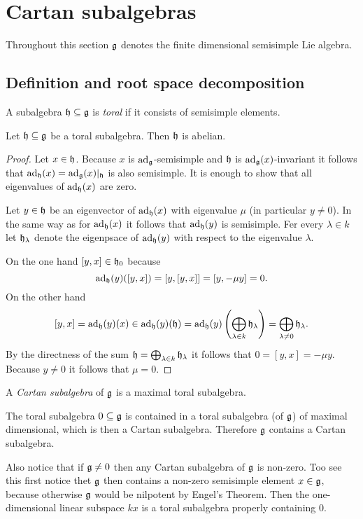 \section{Cartan subalgebras}
Throughout this section $\mathfrak{g}$ denotes the finite dimensional semisimple Lie algebra.





\subsection{Definition and root space decomposition}


\begin{defi}
 A subalgebra $\mathfrak{h} \subseteq \mathfrak{g}$ is \emph{toral} if it consists of semisimple elements.
\end{defi}


\begin{lem}
 Let $\mathfrak{h} \subseteq \mathfrak{g}$ be a toral subalgebra. Then $\mathfrak{h}$ is abelian.
\end{lem}
\begin{proof}
 Let $x \in \mathfrak{h}$. Because $x$ is $\operatorname{ad}_{\mathfrak{g}}$-semisimple and $\mathfrak{h}$ is $\operatorname{ad}_{\mathfrak{g}}(x)$-invariant it follows that $\operatorname{ad}_{\mathfrak{h}}(x) = \operatorname{ad}_{\mathfrak{g}}(x)|_{\mathfrak{h}}$ is also semisimple. It is enough to show that all eigenvalues of $\operatorname{ad}_{\mathfrak{h}}(x)$ are zero.
 
 Let $y \in \mathfrak{h}$ be an eigenvector of $\operatorname{ad}_{\mathfrak{h}}(x)$ with eigenvalue $\mu$ (in particular $y \neq 0$). In the same way as for $\operatorname{ad}_{\mathfrak{h}}(x)$ it follows that $\operatorname{ad}_{\mathfrak{h}}(y)$ is semisimple. Fer every $\lambda \in k$ let $\mathfrak{h}_\lambda$ denote the eigenpsace of $\operatorname{ad}_{\mathfrak{h}}(y)$ with respect to the eigenvalue $\lambda$.
 
  On the one hand $[y,x] \in \mathfrak{h}_0$ because
 \[
  \operatorname{ad}_{\mathfrak{h}}(y)([y,x])
  = [y,[y,x]]
  = [y, -\mu y]
  = 0.
 \]
 On the other hand
 \[
  [y,x]
  = \operatorname{ad}_{\mathfrak{h}}(y)(x)
  \in \operatorname{ad}_{\mathfrak{h}}(y)(\mathfrak{h})
  = \operatorname{ad}_{\mathfrak{h}}(y)\left( \bigoplus_{\lambda \in k} \mathfrak{h}_\lambda \right)
  = \bigoplus_{\lambda \neq 0} \mathfrak{h}_\lambda.
 \]
 By the directness of the sum $\mathfrak{h} = \bigoplus_{\lambda \in k} \mathfrak{h}_\lambda$ it follows that $0 = [y,x] = -\mu y$. Because $y \neq 0$ it follows that $\mu = 0$.
\end{proof}


\begin{defi}
 A \emph{Cartan subalgebra} of $\mathfrak{g}$ is a maximal toral subalgebra.
\end{defi}


\begin{rem}
 The toral subalgebra $0 \subseteq \mathfrak{g}$ is contained in a toral subalgebra (of $\mathfrak{g}$) of maximal dimensional, which is then a Cartan subalgebra. Therefore $\mathfrak{g}$ contains a Cartan subalgebra.
 
 Also notice that if $\mathfrak{g} \neq 0$ then any Cartan subalgebra of $\mathfrak{g}$ is non-zero. Too see this first notice thet $\mathfrak{g}$ then contains a non-zero semisimple element $x \in \mathfrak{g}$, because otherwise $\mathfrak{g}$ would be nilpotent by Engel’s Theorem. Then the one-dimensional linear subspace $kx$ is a toral subalgebra properly containing $0$.
\end{rem}


